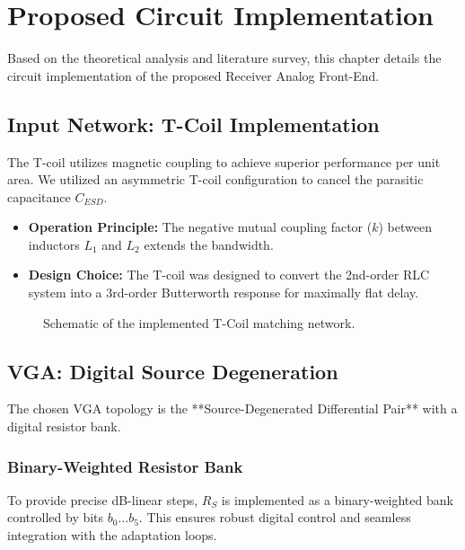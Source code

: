 \chapter{Proposed Circuit Implementation}
\label{Chapter4}

Based on the theoretical analysis and literature survey, this chapter details the circuit implementation of the proposed Receiver Analog Front-End.

\section{Input Network: T-Coil Implementation}
The T-coil utilizes magnetic coupling to achieve superior performance per unit area. We utilized an asymmetric T-coil configuration to cancel the parasitic capacitance $C_{ESD}$.
\begin{itemize}
    \item \textbf{Operation Principle:} The negative mutual coupling factor ($k$) between inductors $L_1$ and $L_2$ extends the bandwidth.
    \item \textbf{Design Choice:} The T-coil was designed to convert the 2nd-order RLC system into a 3rd-order Butterworth response for maximally flat delay.
\end{itemize}

\begin{figure}[htbp]
    \centering
    \setlength{\fboxsep}{0pt}
    \setlength{\fboxrule}{1pt}
    \caption{Schematic of the implemented T-Coil matching network.}
    \label{fig:t_coil_schematic}
\end{figure}

\section{VGA: Digital Source Degeneration}
The chosen VGA topology is the **Source-Degenerated Differential Pair** with a digital resistor bank.

\subsection{Binary-Weighted Resistor Bank}
To provide precise dB-linear steps, $R_S$ is implemented as a binary-weighted bank controlled by bits $b_0 \dots b_5$. This ensures robust digital control and seamless integration with the adaptation loops.

